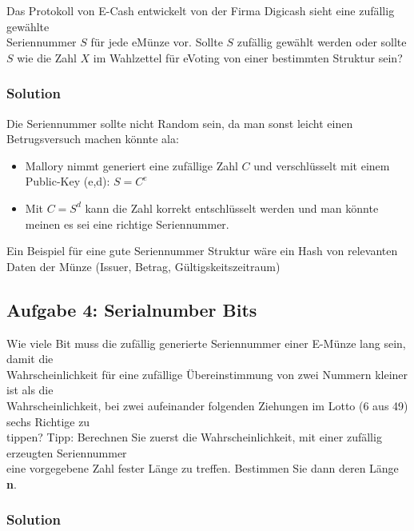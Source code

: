 \documentclass[11pt]{article}
\begin{document}
Das Protokoll von E-Cash entwickelt von der Firma Digicash sieht eine
zufällig gewählte\\
Seriennummer \(S\) für jede eMünze vor. Sollte \(S\) zufällig gewählt
werden oder sollte \(S\) wie die Zahl \(X\) im
Wahlzettel für eVoting von einer bestimmten Struktur sein?

\hypertarget{solution}{%
\subsubsection{Solution}\label{solution}}

Die Seriennummer sollte nicht Random sein, da man sonst leicht einen
Betrugsversuch machen könnte ala:

\begin{itemize}
\item
  Mallory nimmt generiert eine zufällige Zahl \(C\) und verschlüsselt
  mit einem Public-Key (e,d): \(S=C^{e}\)
\item
  Mit \(C = S^{d}\) kann die Zahl korrekt entschlüsselt werden und
  man könnte meinen es sei eine richtige Seriennummer.
\end{itemize}

Ein Beispiel für eine gute Seriennummer Struktur wäre ein Hash von
relevanten Daten der Münze (Issuer, Betrag, Gültigskeitszeitraum)

    \hypertarget{aufgabe-4-serialnumber-bits}{%
\subsection{Aufgabe 4: Serialnumber
Bits}\label{aufgabe-4-serialnumber-bits}}

Wie viele Bit muss die zufällig generierte Seriennummer einer E-Münze
lang sein, damit die\\
Wahrscheinlichkeit für eine zufällige Übereinstimmung von zwei Nummern
kleiner ist als die\\
Wahrscheinlichkeit, bei zwei aufeinander folgenden Ziehungen im Lotto (6
aus 49) sechs Richtige zu\\
tippen? Tipp: Berechnen Sie zuerst die Wahrscheinlichkeit, mit einer
zufällig erzeugten Seriennummer\\
eine vorgegebene Zahl fester Länge zu treffen. Bestimmen Sie dann deren
Länge \textbf{n}.

\hypertarget{solution}{%
\subsubsection{Solution}\label{solution}}
\end{document}
